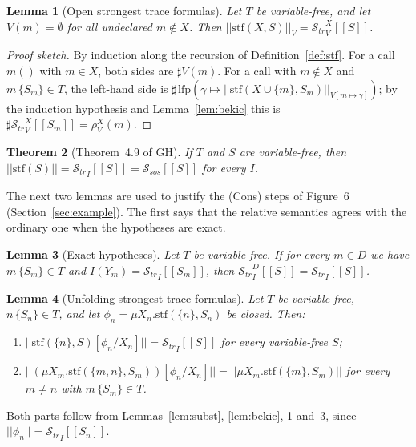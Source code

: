 \documentclass[11pt]{article}
\newcommand{\sem}[1]{[\![ #1 ]\!]}
\newcommand{\fsem}[1]{|\!|#1|\!|}
\newcommand{\Str}{{\mathcal{S}_{\mathit{tr}}}}
\newcommand{\Ssos}{{\mathcal{S}_{\mathit{sos}}}}
\newcommand{\dup}{\sharp}
\newcommand{\stf}{\mathrm{stf}}
\newcommand{\call}[1]{#1()}
\newcommand{\lfp}{\mathrm{lfp}}
\newcommand{\GH}[1]{#1 of GH}
\theoremstyle{plain}
\newtheorem{theorem}{Theorem}[section]
\newtheorem{lemma}[theorem]{Lemma}
\theoremstyle{definition}
\theoremstyle{remark}
\begin{document}
\begin{lemma}[Open strongest trace formulas]\label{lem:stf-open}
  Let $T$ be variable-free, and let $V(m) = \emptyset$ for all undeclared
  $m \notin X$. Then $\fsem{\stf(X, S)}_V = \Str^X_V\sem{S}$.
\end{lemma}

\begin{proof}[Proof sketch]
  By induction along the recursion of Definition~\ref{def:stf}. For a call
  $\call{m}$ with $m \in X$, both sides are $\dup V(m)$. For a call with
  $m \notin X$ and $m\,\{S_m\} \in T$, the left-hand side is
  $\dup\,\lfp(\gamma \mapsto \fsem{\stf(X \cup \{m\}, S_m)}_{V[m \mapsto
    \gamma]})$; by the induction hypothesis and Lemma~\ref{lem:bekic} this is
  $\dup\Str^X_V\sem{S_m} = \rho^X_V(m)$.
\end{proof}

\begin{theorem}[\GH{Theorem~4.9}]\label{thm:stf}
  If $T$ and $S$ are variable-free, then
  $\fsem{\stf(S)} = \Str_I\sem{S} = \Ssos\sem{S}$ for every $I$.
\end{theorem}

The next two lemmas are used to justify the (Cons) steps of Figure~6
(Section~\ref{sec:example}). The first says that the relative semantics
agrees with the ordinary one when the hypotheses are exact.

\begin{lemma}[Exact hypotheses]\label{lem:exact}
  Let $T$ be variable-free. If for every $m \in D$ we have
  $m\,\{S_m\} \in T$ and $I(Y_m) = \Str_I\sem{S_m}$, then
  $\Str^D_I\sem{S} = \Str_I\sem{S}$.
\end{lemma}

\begin{lemma}[Unfolding strongest trace formulas]\label{lem:unfold}
  Let $T$ be variable-free, $n\,\{S_n\} \in T$, and let
  $\phi_n = \mu X_n.\stf(\{n\}, S_n)$ be closed. Then:
  \begin{enumerate}[label=(\alph*)]
  \item $\fsem{\stf(\{n\}, S)[\phi_n/X_n]} = \Str_I\sem{S}$ for every
    variable-free $S$;
  \item $\fsem{(\mu X_m.\stf(\{m, n\}, S_m))[\phi_n/X_n]} =
    \fsem{\mu X_m.\stf(\{m\}, S_m)}$ for every $m \neq n$ with
    $m\,\{S_m\} \in T$.
  \end{enumerate}
\end{lemma}

Both parts follow from Lemmas~\ref{lem:subst}, \ref{lem:bekic},
\ref{lem:stf-open} and~\ref{lem:exact}, since $\fsem{\phi_n} =
\Str_I\sem{S_n}$.
\end{document}
